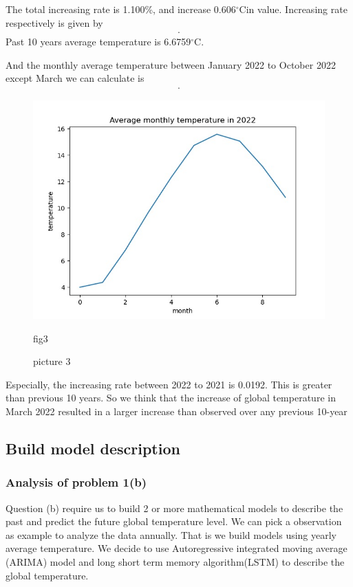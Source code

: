 \documentclass{apmcmthesis}
\def\oc{$^{\circ}$C\;}
\begin{document}
The total increasing rate is 1.100\%, and increase 0.606\oc in value.
Increasing rate respectively is given by
\begin{align*}
  [ -0.0941,-0.0146,0.0357,0.0224,0.0599,0.1120, -0.0456,-0.0653, 0.0640,-0.0070,-0.0512].
\end{align*}
Past 10 years average temperature is 6.6759\oc. 

And the monthly average temperature between January 2022 to October 2022 except March we can calculate is 
\begin{align*}
  [3.989,  4.358, 6.812,9.665, 12.313, 14.742, 15.588, 15.07 ,13.151, 10.811].
\end{align*}
\begin{figure}[htbp]
  \centering
  \includegraphics[scale=0.35]{Average monthly temperature in 2022.jpg}
  \caption{picture 3}{fig3}
\end{figure}

Especially, the increasing rate between 2022 to 2021 is 0.0192.
This is greater than previous 10 years.
So we think that the increase of global temperature in March 2022 resulted in a larger increase than observed over any previous 10-year 


\subsection{Build model description}
\subsubsection{Analysis of problem 1(b)}
Question (b) require us to build 2 or more mathematical models to describe the past and predict the future global temperature level.
We can pick a observation as example to analyze the data annually. 
That is we build models using yearly average temperature. 
We decide to use Autoregressive integrated moving average (ARIMA) model and long short term memory algorithm(LSTM) to describe the global temperature.
\end{document}
